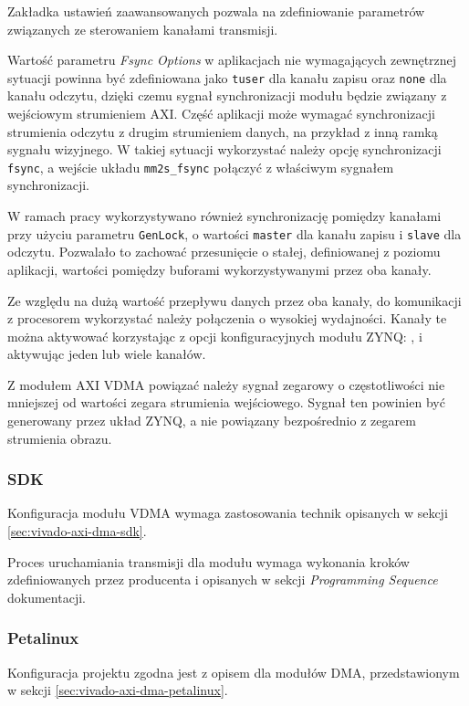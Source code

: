 Zakładka ustawień zaawansowanych pozwala na zdefiniowanie parametrów związanych ze sterowaniem kanałami transmisji.

Wartość parametru \textit{Fsync Options} w aplikacjach nie wymagających zewnętrznej sytuacji powinna być zdefiniowana jako \texttt{tuser} dla kanału zapisu oraz \texttt{none} dla kanału odczytu, dzięki czemu sygnał synchronizacji modułu będzie związany z wejściowym strumieniem AXI. Część aplikacji może wymagać synchronizacji strumienia odczytu z drugim strumieniem danych, na przykład z inną ramką sygnału wizyjnego. W takiej sytuacji wykorzystać należy opcję synchronizacji \texttt{fsync}, a wejście układu \texttt{mm2s\_fsync} połączyć z właściwym sygnałem synchronizacji.

W ramach pracy wykorzystywano również synchronizację pomiędzy kanałami przy użyciu parametru \texttt{GenLock}, o wartości \texttt{master} dla kanału zapisu i \texttt{slave} dla odczytu. Pozwalało to zachować przesunięcie o stałej, definiowanej z poziomu aplikacji, wartości pomiędzy buforami wykorzystywanymi przez oba kanały.

Ze względu na dużą wartość przepływu danych przez oba kanały, do komunikacji z procesorem wykorzystać należy połączenia o wysokiej wydajności. Kanały te można aktywować korzystając z opcji konfiguracyjnych modułu ZYNQ: , i aktywując jeden lub wiele kanałów.

Z modułem AXI VDMA powiązać należy sygnał zegarowy o częstotliwości nie mniejszej od wartości zegara strumienia wejściowego. Sygnał ten powinien być generowany przez układ ZYNQ, a nie powiązany bezpośrednio z zegarem strumienia obrazu.

\subsubsection{SDK}
Konfiguracja modułu VDMA wymaga zastosowania technik opisanych w sekcji \ref{sec:vivado-axi-dma-sdk}.

Proces uruchamiania transmisji dla modułu wymaga wykonania kroków zdefiniowanych przez producenta i opisanych w sekcji \textit{Programming Sequence} dokumentacji. \cite{axi-vdma-guide}
\subsubsection{Petalinux}
Konfiguracja projektu zgodna jest z opisem dla modułów DMA, przedstawionym w sekcji \ref{sec:vivado-axi-dma-petalinux}.

